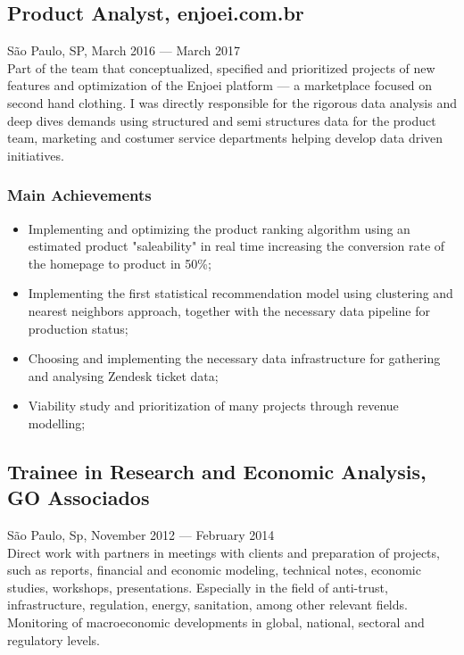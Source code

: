 \documentclass{article}
\newcommand{\jobdate}[3]{
\large
\vspace{0.05em} 
  {#1, #2 --- #3}
\vspace{0.5em} 
\\
}
\begin{document}
\begin{itemize}
\begin{itemize}
\end{itemize}

\subsection{Product Analyst, enjoei.com.br}
\jobdate{São Paulo, SP}{March 2016}{March 2017}
Part of the team that conceptualized, specified and prioritized projects of new features and optimization of the Enjoei platform --- a marketplace focused on second hand clothing. I was directly responsible for the rigorous data analysis and deep dives demands using structured and semi structures data for the product team, marketing and costumer service departments helping develop data driven initiatives.
\subsubsection{Main Achievements}

\begin{itemize}

\item{Implementing and optimizing the product ranking algorithm using an estimated product "saleability" in real time increasing the conversion rate of the homepage to product in 50\%;}
\item{Implementing the first statistical recommendation model using clustering and nearest neighbors approach, together with the necessary data pipeline for production status;}
\item{Choosing and implementing the necessary data infrastructure for gathering and analysing Zendesk ticket data;}
\item{Viability study and prioritization of many projects through revenue modelling;}

\end{itemize}
\pagebreak
\subsection{Trainee in Research and Economic Analysis, GO Associados}
\jobdate{São Paulo, Sp}{November 2012}{February 2014}
Direct work with partners in meetings with clients and preparation of projects, such as reports, financial and economic modeling, technical notes, economic studies, workshops, presentations. Especially in the field of anti-trust, infrastructure, regulation, energy, sanitation, among other relevant fields.  Monitoring of macroeconomic developments in global, national, sectoral and
regulatory levels.

\end{itemize}
\end{document}
